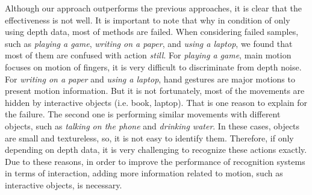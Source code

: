 \documentclass[final,3p,times,twocolumn]{elsarticle}
\begin{document}
Although our approach outperforms the previous approaches, it is clear that the effectiveness is not well.
It is important to note that why in condition of only using depth data, most of methods are failed.
When considering failed samples, such as \textit{playing a game}, \textit{writing on a paper}, and \textit{using a laptop}, we found that most of them are confused with action \textit{still}.
For \textit{playing a game}, main motion focuses on motion of fingers, it is very difficult to discriminate from depth noise.
For \textit{writing on a paper} and \textit{using a laptop}, hand gestures are major motions to present motion information.
But it is not fortunately, most of the movements are hidden by interactive objects (i.e. book, laptop).
That is one reason to explain for the failure.
The second one is performing similar movements with different objects, such as \textit{talking on the phone} and \textit{drinking water}.
In these cases, objects are small and textureless, so, it is not easy to identify them.
Therefore, if only depending on depth data, it is very challenging to recognize these actions exactly.
Due to these reasons, in order to improve the performance of recognition systems in terms of interaction, adding more information related to motion, such as interactive objects, is necessary.
\end{document}

